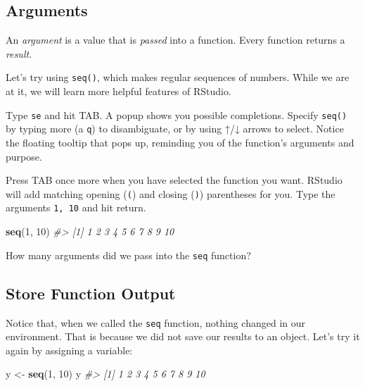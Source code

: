 \documentclass[
]{book}
\newenvironment{Shaded}{\begin{snugshade}}{\end{snugshade}}
\newcommand{\CommentTok}[1]{\textcolor[rgb]{0.56,0.35,0.01}{\textit{#1}}}
\newcommand{\DecValTok}[1]{\textcolor[rgb]{0.00,0.00,0.81}{#1}}
\newcommand{\KeywordTok}[1]{\textcolor[rgb]{0.13,0.29,0.53}{\textbf{#1}}}
\newcommand{\NormalTok}[1]{#1}
\newcommand{\StringTok}[1]{\textcolor[rgb]{0.31,0.60,0.02}{#1}}
\begin{document}
\hypertarget{arguments}{%
\subsection{Arguments}\label{arguments}}

An \emph{argument} is a value that is \emph{passed} into a function. Every function returns a \emph{result}.

Let's try using \texttt{seq()}, which makes regular sequences of numbers. While we are at it, we will learn more helpful features of RStudio.

Type \texttt{se} and hit TAB. A popup shows you possible completions. Specify \texttt{seq()} by typing more (a \texttt{q}) to disambiguate, or by using ↑/↓ arrows to select. Notice the floating tooltip that pops up, reminding you of the function's arguments and purpose.

Press TAB once more when you have selected the function you want. RStudio will add matching opening (\texttt{(}) and closing (\texttt{)}) parentheses for you. Type the arguments \texttt{1,\ 10} and hit return.

\begin{Shaded}
\begin{Highlighting}[]
\KeywordTok{seq}\NormalTok{(}\DecValTok{1}\NormalTok{, }\DecValTok{10}\NormalTok{)}
\CommentTok{#>  [1]  1  2  3  4  5  6  7  8  9 10}
\end{Highlighting}
\end{Shaded}

How many arguments did we pass into the \texttt{seq} function?

\hypertarget{store-function-output}{%
\subsection{Store Function Output}\label{store-function-output}}

Notice that, when we called the \texttt{seq} function, nothing changed in our environment. That is because we did not save our results to an object. Let's try it again by assigning a variable:

\begin{Shaded}
\begin{Highlighting}[]
\NormalTok{y <-}\StringTok{ }\KeywordTok{seq}\NormalTok{(}\DecValTok{1}\NormalTok{, }\DecValTok{10}\NormalTok{)}
\NormalTok{y}
\CommentTok{#>  [1]  1  2  3  4  5  6  7  8  9 10}
\end{Highlighting}
\end{Shaded}
\end{document}
